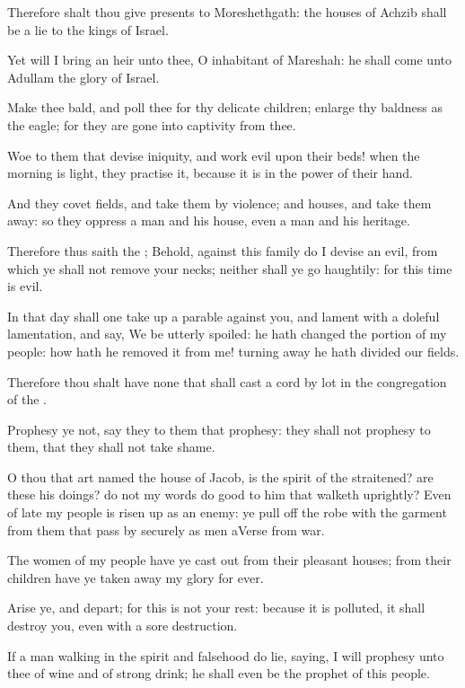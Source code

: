 \Verse Therefore shalt thou give presents to Moreshethgath: the houses of Achzib shall be a lie to the kings of Israel.

\Verse Yet will I bring an heir unto thee, O inhabitant of Mareshah: he shall come unto Adullam the glory of Israel.

\Verse Make thee bald, and poll thee for thy delicate children; enlarge thy baldness as the eagle; for they are gone into captivity from thee.


\Chapter
\Verse Woe to them that devise iniquity, and work evil upon their beds!  when the morning is light, they practise it, because it is in the power of their hand.

\Verse And they covet fields, and take them by violence; and houses, and take them away: so they oppress a man and his house, even a man and his heritage.

\Verse Therefore thus saith the \LORD; Behold, against this family do I devise an evil, from which ye shall not remove your necks; neither shall ye go haughtily: for this time is evil.

\Verse In that day shall one take up a parable against you, and lament with a doleful lamentation, and say, We be utterly spoiled: he hath changed the portion of my people: how hath he removed it from me!  turning away he hath divided our fields.

\Verse Therefore thou shalt have none that shall cast a cord by lot in the congregation of the \LORD.

\Verse Prophesy ye not, say they to them that prophesy: they shall not prophesy to them, that they shall not take shame.

\Verse O thou that art named the house of Jacob, is the spirit of the \LORD straitened? are these his doings? do not my words do good to him that walketh uprightly?  \Verse Even of late my people is risen up as an enemy: ye pull off the robe with the garment from them that pass by securely as men aVerse from war.

\Verse The women of my people have ye cast out from their pleasant houses; from their children have ye taken away my glory for ever.

\Verse Arise ye, and depart; for this is not your rest: because it is polluted, it shall destroy you, even with a sore destruction.

\Verse If a man walking in the spirit and falsehood do lie, saying, I will prophesy unto thee of wine and of strong drink; he shall even be the prophet of this people.

